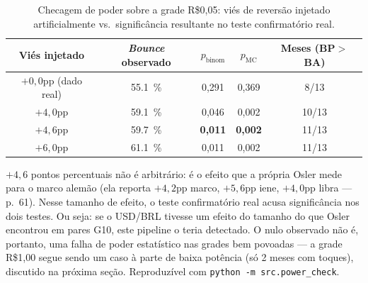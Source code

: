 \documentclass[11pt,a4paper]{article}
\begin{document}
\begin{table}[htbp]
  \centering
  \caption{Checagem de poder sobre a grade R\$0,05: viés de reversão injetado
  artificialmente vs.\ significância resultante no teste confirmatório real.}
  \label{tab:power}
  \small
  \begin{tabular}{ccccc}
    \toprule
    Viés injetado & \emph{Bounce} observado & $p_{\text{binom}}$ & $p_{\text{MC}}$ & Meses (BP$>$BA) \\
    \midrule
    $+0{,}0$pp (dado real) & \SI{55.1}{\percent} & 0,291 & 0,369 & 8/13 \\
    $+4{,}0$pp             & \SI{59.1}{\percent} & 0,046 & 0,002 & 10/13 \\
    $+4{,}6$pp             & \SI{59.7}{\percent} & \textbf{0,011} & \textbf{0,002} & 11/13 \\
    $+6{,}0$pp             & \SI{61.1}{\percent} & 0,011 & 0,002 & 11/13 \\
    \bottomrule
  \end{tabular}
\end{table}

$+4{,}6$ pontos percentuais não é arbitrário: é o efeito que a própria Osler mede para o marco
alemão (ela reporta $+4{,}2$pp marco, $+5{,}6$pp iene, $+4{,}0$pp libra --- p.~61). Nesse
tamanho de efeito, o teste confirmatório real acusa significância nos dois testes. Ou seja: se
o USD/BRL tivesse um efeito do tamanho do que Osler encontrou em pares G10, este pipeline o
teria detectado. O nulo observado não é, portanto, uma falha de poder estatístico nas grades
bem povoadas --- a grade R\$1,00 segue sendo um caso à parte de baixa potência (só 2 meses com
toques), discutido na próxima seção. Reproduzível com \texttt{python -m src.power\_check}.
\end{document}
